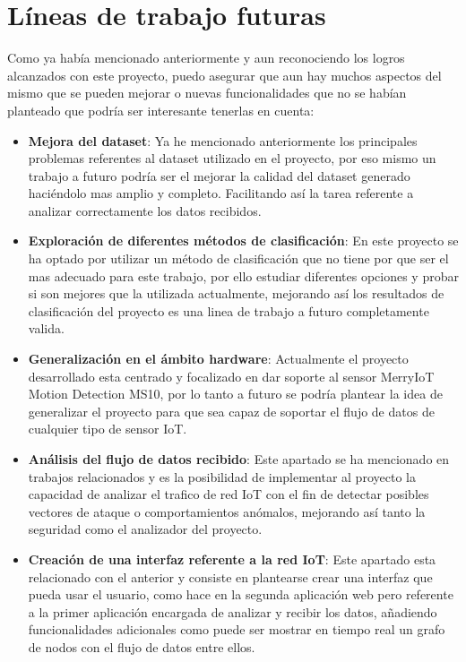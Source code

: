 \section{Líneas de trabajo futuras}

Como ya había mencionado anteriormente y aun reconociendo los logros alcanzados con este proyecto, puedo asegurar que aun hay muchos aspectos del mismo que se pueden mejorar o nuevas funcionalidades que no se habían planteado que podría ser interesante tenerlas en cuenta:

\begin{itemize}
    \item \textbf{Mejora del dataset}:
    Ya he mencionado anteriormente los principales problemas referentes al dataset utilizado en el proyecto, por eso mismo un trabajo a futuro podría ser el mejorar la calidad del dataset generado haciéndolo mas amplio y completo. Facilitando así la tarea referente a analizar correctamente los datos recibidos.
    
    \item \textbf{Exploración de diferentes métodos de clasificación}:
    En este proyecto se ha optado por utilizar un método de clasificación que no tiene por que ser el mas adecuado para este trabajo, por ello estudiar diferentes opciones y probar si son mejores que la utilizada actualmente, mejorando así los resultados de clasificación del proyecto es una linea de trabajo a futuro completamente valida.
    
    \item \textbf{Generalización en el ámbito hardware}:
    Actualmente el proyecto desarrollado esta centrado y focalizado en dar soporte al sensor MerryIoT Motion Detection MS10, por lo tanto a futuro se podría plantear la idea de generalizar el proyecto para que sea capaz de soportar el flujo de datos de cualquier tipo de sensor IoT.
    
    \item \textbf{Análisis del flujo de datos recibido}:
    Este apartado se ha mencionado en trabajos relacionados y es la posibilidad de implementar al proyecto la capacidad de analizar el trafico de red IoT con el fin de detectar posibles vectores de ataque o comportamientos anómalos, mejorando así tanto la seguridad como el analizador del proyecto.
    
    \item \textbf{Creación de una interfaz referente a la red IoT}:
    Este apartado esta relacionado con el anterior y consiste en plantearse crear una interfaz que pueda usar el usuario, como hace en la segunda aplicación web pero referente a la primer aplicación encargada de analizar y recibir los datos, añadiendo funcionalidades adicionales como puede ser mostrar en tiempo real un grafo de nodos con el flujo de datos entre ellos.
\end{itemize}